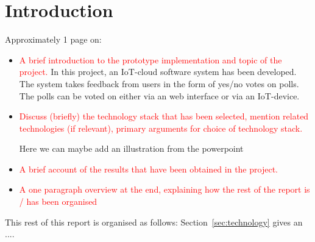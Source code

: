 \section{Introduction}
\label{sec:introduction}

Approximately 1 page on:


\begin{itemize}

\item \textcolor{red}{A brief introduction to the prototype implementation and topic of the project.}
In this project, an IoT-cloud software system has been developed. The system takes feedback from users in the form of yes/no votes on polls. The polls can be voted on either via an web interface or via an IoT-device. 

\item \textcolor{red}{Discuss (briefly) the technology stack that has been selected, mention related technologies (if relevant), primary arguments for choice of technology stack.}

Here we can maybe add an illustration from the powerpoint 


\item \textcolor{red}{A brief account of the results that have been obtained in the project.}

\item\textcolor{red}{ A one paragraph overview at the end, explaining how the rest of the report is / has been organised}

\end{itemize}

\noindent
This rest of this report is organised as follows:
Section~\ref{sec:technology} gives an ....
